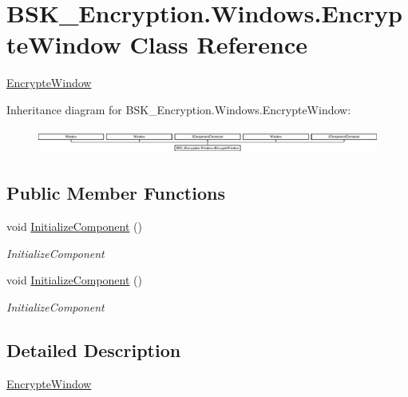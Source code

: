\hypertarget{class_b_s_k___encryption_1_1_windows_1_1_encrypte_window}{}\section{B\+S\+K\+\_\+\+Encryption.\+Windows.\+Encrypte\+Window Class Reference}
\label{class_b_s_k___encryption_1_1_windows_1_1_encrypte_window}


\mbox{\hyperlink{class_b_s_k___encryption_1_1_windows_1_1_encrypte_window}{Encrypte\+Window}}  


Inheritance diagram for B\+S\+K\+\_\+\+Encryption.\+Windows.\+Encrypte\+Window\+:\begin{figure}[H]
\begin{center}
\leavevmode
\includegraphics[height=0.845283cm]{class_b_s_k___encryption_1_1_windows_1_1_encrypte_window}
\end{center}
\end{figure}
\subsection*{Public Member Functions}
\begin{DoxyCompactItemize}
\item 
void \mbox{\hyperlink{class_b_s_k___encryption_1_1_windows_1_1_encrypte_window_a4d32979e0c636b65dbbdf621f64070d1}{Initialize\+Component}} ()
\begin{DoxyCompactList}\small\item\em Initialize\+Component \end{DoxyCompactList}\item 
void \mbox{\hyperlink{class_b_s_k___encryption_1_1_windows_1_1_encrypte_window_a4d32979e0c636b65dbbdf621f64070d1}{Initialize\+Component}} ()
\begin{DoxyCompactList}\small\item\em Initialize\+Component \end{DoxyCompactList}\end{DoxyCompactItemize}


\subsection{Detailed Description}
\mbox{\hyperlink{class_b_s_k___encryption_1_1_windows_1_1_encrypte_window}{Encrypte\+Window}} 

